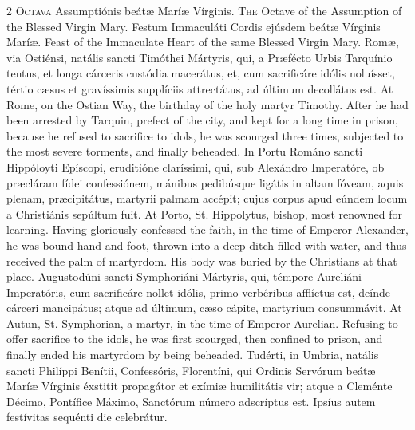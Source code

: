 \begin{paracol}{2}
\lettrine[lines=2]{O}{ctava} Assumptiónis 
 beátæ Maríæ Vírginis.
\switchcolumn
{}
\lettrine[lines=2]{T}{he} Octave of the Assumption of the 
 Blessed Virgin Mary.
\switchcolumn*
{}
Festum Immaculáti 
 Cordis ejúsdem beátæ Vírginis Maríæ.
\switchcolumn
{}
Feast of the Immaculate Heart of the 
 same Blessed Virgin Mary.
\switchcolumn*
{}
Romæ, via Ostiénsi, 
 natális sancti Timóthei Mártyris, qui, a Præfécto Urbis Tarquínio tentus, et 
 longa cárceris custódia macerátus, et, cum sacrificáre idólis noluísset, 
 tértio cæsus et gravíssimis supplíciis attrectátus, ad últimum decollátus 
 est.
\switchcolumn
{}
At Rome, on the Ostian Way, the 
 birthday of the holy martyr Timothy. After he had been arrested by 
 Tarquin, prefect of the city, and kept for a long time in prison, because he 
 refused to sacrifice to idols, he was scourged three times, subjected to the 
 most severe torments, and finally beheaded.
\switchcolumn*
{}
In Portu Románo sancti 
 Hippóloyti Epíscopi, eruditióne claríssimi, qui, sub Alexándro Imperatóre, ob 
 præcláram fídei confessiónem, mánibus pedibúsque ligátis in altam fóveam, 
 aquis plenam, præcipitátus, martyrii palmam accépit; cujus corpus apud 
 eúndem locum a Christiánis sepúltum fuit.
\switchcolumn
{}
At Porto, St. Hippolytus, bishop, 
 most renowned for learning. Having gloriously confessed the faith, in 
 the time of Emperor Alexander, he was bound hand and foot, thrown into a 
 deep ditch filled with water, and thus received the palm of martyrdom. 
 His body was buried by the Christians at that place.
\switchcolumn*
{}
Augustodúni sancti 
 Symphoriáni Mártyris, qui, témpore Aureliáni Imperatóris, cum sacrificáre 
 nollet idólis, primo verbéribus afflíctus est, deínde cárceri mancipátus; 
 atque ad últimum, cæso cápite, martyrium consummávit.
\switchcolumn
{}
At Autun, St. Symphorian, a martyr, 
 in the time of Emperor Aurelian. Refusing to offer sacrifice to the 
 idols, he was first scourged, then confined to prison, and finally ended his 
 martyrdom by being beheaded.
\switchcolumn*
{}
Tudérti, in Umbria, 
 natális sancti Philíppi Benítii, Confessóris, Florentíni, qui Ordinis 
 Servórum beátæ Maríæ Vírginis éxstitit propagátor et exímiæ humilitátis vir; 
 atque a Cleménte Décimo, Pontífice Máximo, Sanctórum número adscríptus est. 
 Ipsíus autem festívitas sequénti die celebrátur.

\end{paracol}
